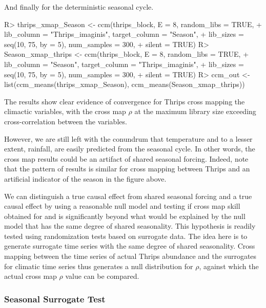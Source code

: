\documentclass[article]{jss}
\begin{document}
And finally for the deterministic seasonal cycle.

\begin{Schunk}
\begin{Sinput}
R> thrips_xmap_Season <- ccm(thrips_block, E = 8, random_libs = TRUE,
+                            lib_column = "Thrips_imaginis", target_column = "Season",
+                            lib_sizes = seq(10, 75, by = 5), num_samples = 300, 
+                            silent = TRUE)
R> Season_xmap_thrips <- ccm(thrips_block, E = 8, random_libs = TRUE,
+                            lib_column = "Season", target_column = "Thrips_imaginis",
+                            lib_sizes = seq(10, 75, by = 5), num_samples = 300, 
+                            silent = TRUE)
R> ccm_out <- list(ccm_means(thrips_xmap_Season), ccm_means(Season_xmap_thrips))
\end{Sinput}
\end{Schunk}


The results show clear evidence of convergence for Thrips cross mapping the climactic variables, with the cross map $\rho$ at the maximum library size exceeding cross-correlation between the variables.

However, we are still left with the conundrum that temperature and to a lesser extent, rainfall, are easily predicted from the seasonal cycle. In other words, the cross map results could be an artifact of shared seasonal forcing. Indeed, note that the pattern of results is similar for cross mapping between Thrips and an artificial indicator of the season in the figure above.

We can distinguish a true causal effect from shared seasonal forcing and a true causal effect by using a reasonable null model and testing if cross map skill obtained for  and  is significantly beyond what would be explained by the null model that has the same degree of shared seasonality. This hypothesis is readily tested using randomization tests based on surrogate data. The idea here is to generate surrogate time series with the same degree of shared seasonality. Cross mapping between the time series of actual Thrips abundance and the surrogates for climatic time series thus generates a null distribution for $\rho$, against which the actual cross map $\rho$ value can be compared.

\subsubsection{Seasonal Surrogate Test}\label{sec:seasonal-surrogate-test}
\end{document}
